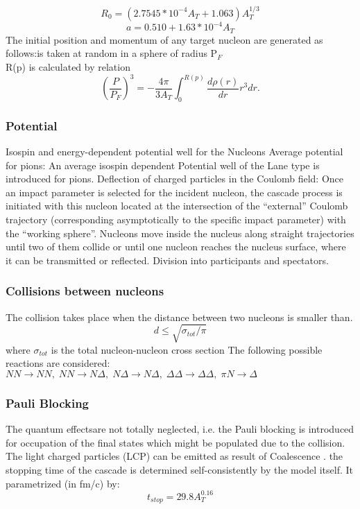 \begin{equation}
R_{0}=(2.7545*10^{-4}A_{T}+1.063)A_{T}^{1/3}
\end{equation}
\begin{equation}
a=0.510 + 1.63 *10^{-4}A_{T}
\end{equation}
The initial position and momentum of any target nucleon are generated as follows:is taken at random in a sphere of radius P$_{F}$\\
R(p) is calculated by relation 
\begin{equation}
\left(\frac{P}{P_{F}}\right)^{3}=-\frac{4\pi}{3A_{T}}\int_{0}^{R(p)}\frac{d\rho(r)}{dr}r^{3}dr.
\end{equation}
\subsubsection{Potential}
Isospin and energy-dependent potential well for the
Nucleons
Average potential for pions:  An average isospin dependent Potential well of the Lane type is introduced for pions.
Deflection of charged particles in the Coulomb field: Once an impact parameter is selected for the incident nucleon, the cascade process is initiated with this nucleon located at the intersection of the “external” Coulomb trajectory (corresponding asymptotically to the specific impact parameter) with the “working sphere”.
Nucleons move inside the nucleus along straight trajectories until two of them collide or until one nucleon reaches the nucleus surface, where it can be transmitted or reflected.
Division into participants and spectators.
\subsubsection{Collisions between nucleons}
The collision takes place when the distance between two nucleons is smaller than.
\begin{equation}
d\leq\sqrt{\sigma_{tot}/\pi}
\end{equation}
where $\sigma_{tot}$ is the total nucleon-nucleon cross section
The following possible reactions are considered:
$NN\rightarrow NN, \; NN\rightarrow N\Delta, \; N\Delta\rightarrow N\Delta, \; \Delta\Delta\rightarrow \Delta\Delta, \; \pi N\rightarrow \Delta$
\subsubsection{Pauli Blocking }
The quantum effectsare not totally neglected, i.e. the Pauli blocking is introduced for occupation of the final states which might be populated due to the collision.
The light charged particles (LCP) can be emitted as result of Coalescence .
the stopping time of the cascade is determined self-consistently by the model itself. It parametrized (in fm/c) by:
\begin{equation}
t_{stop}=29.8A_{T}^{0.16}
\end{equation}
